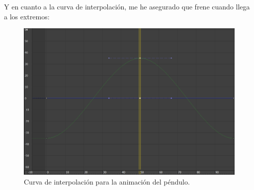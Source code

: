 \documentclass{article}
\begin{document}
\bigskip

Y en cuanto a la curva de interpolación, me he asegurado que frene cuando llega a los extremos:

\begin{figure}[H]
    \centering
    \includegraphics[width=\textwidth]{imagenes/Ejercicio 3/curva.png}
    \caption{Curva de interpolación para la animación del péndulo.}
\end{figure}
\end{document}
